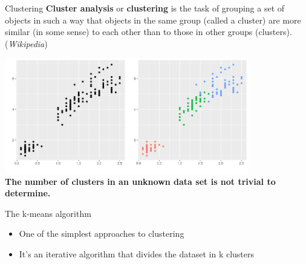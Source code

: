 \documentclass[9pt]{beamer}
\begin{document}
\begin{frame}
{Clustering}
\textbf{Cluster analysis} or \textbf{clustering} is the task of grouping a set of objects in such a way that objects in the same group (called a cluster) are more similar (in some sense) to each other than to those in other groups (clusters). (\textit{Wikipedia})
\pause

\centering \includegraphics[width=0.8\textwidth]{clustering.png}\\

\pause
\textbf{The number of clusters in an unknown data set is not trivial to determine.}
\end{frame}

\begin{frame}
{The k-means algorithm}

\begin{itemize}
\item One of the simplest approaches to clustering
\item It's an iterative algorithm that divides the dataset in k clusters
\end{itemize}
\end{frame}
\end{document}
